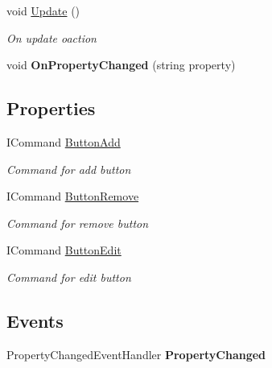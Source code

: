 \begin{DoxyCompactItemize}
void \hyperlink{class_baudi_1_1_client_1_1_view_models_1_1_tabs_view_models_1_1_tab_view_model_a2b7600ae75cbd556e16119f6792f9545}{Update} ()
\begin{DoxyCompactList}\small\item\em On update oaction \end{DoxyCompactList}\item 
\hypertarget{class_baudi_1_1_client_1_1_view_models_1_1_tabs_view_models_1_1_tab_view_model_a1c201da641a98780d9194a10bfe366e7}{}void {\bfseries On\+Property\+Changed} (string property)\label{class_baudi_1_1_client_1_1_view_models_1_1_tabs_view_models_1_1_tab_view_model_a1c201da641a98780d9194a10bfe366e7}

\end{DoxyCompactItemize}
\subsection*{Properties}
\begin{DoxyCompactItemize}
\item 
I\+Command \hyperlink{class_baudi_1_1_client_1_1_view_models_1_1_tabs_view_models_1_1_tab_view_model_a0e3a28aa0263ebd2335cf262136abb2d}{Button\+Add}
\begin{DoxyCompactList}\small\item\em Command for add button \end{DoxyCompactList}\item 
I\+Command \hyperlink{class_baudi_1_1_client_1_1_view_models_1_1_tabs_view_models_1_1_tab_view_model_a895b8e41b63892f512ed2d1846b0be0b}{Button\+Remove}
\begin{DoxyCompactList}\small\item\em Command for remove button \end{DoxyCompactList}\item 
I\+Command \hyperlink{class_baudi_1_1_client_1_1_view_models_1_1_tabs_view_models_1_1_tab_view_model_aafe406c7e143b73a88e6b1de174a470c}{Button\+Edit}
\begin{DoxyCompactList}\small\item\em Command for edit button \end{DoxyCompactList}\end{DoxyCompactItemize}
\subsection*{Events}
\begin{DoxyCompactItemize}
\item 
\hypertarget{class_baudi_1_1_client_1_1_view_models_1_1_tabs_view_models_1_1_tab_view_model_ac450064e702bb07bb55efa1fdce7888e}{}Property\+Changed\+Event\+Handler {\bfseries Property\+Changed}\label{class_baudi_1_1_client_1_1_view_models_1_1_tabs_view_models_1_1_tab_view_model_ac450064e702bb07bb55efa1fdce7888e}

\end{DoxyCompactItemize}


